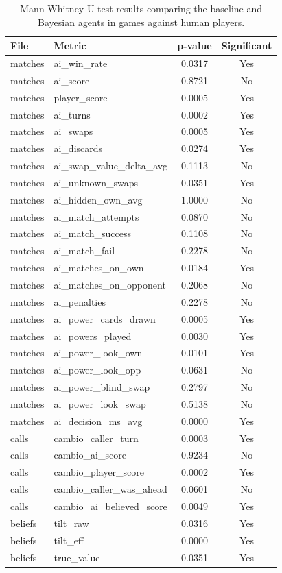 \documentclass[12pt,a4paper,oneside]{report}
\begin{document}
\begin{table}[H]
\centering
\small
\begin{tabular}{llcc}
\hline
\textbf{File} & \textbf{Metric} & \textbf{p-value} & \textbf{Significant} \\
\hline
matches & ai\_win\_rate & 0.0317 & Yes \\
matches & ai\_score & 0.8721 & No \\
matches & player\_score & 0.0005 & Yes \\
matches & ai\_turns & 0.0002 & Yes \\
matches & ai\_swaps & 0.0005 & Yes \\
matches & ai\_discards & 0.0274 & Yes \\
matches & ai\_swap\_value\_delta\_avg & 0.1113 & No \\
matches & ai\_unknown\_swaps & 0.0351 & Yes \\
matches & ai\_hidden\_own\_avg & 1.0000 & No \\
matches & ai\_match\_attempts & 0.0870 & No \\
matches & ai\_match\_success & 0.1108 & No \\
matches & ai\_match\_fail & 0.2278 & No \\
matches & ai\_matches\_on\_own & 0.0184 & Yes \\
matches & ai\_matches\_on\_opponent & 0.2068 & No \\
matches & ai\_penalties & 0.2278 & No \\
matches & ai\_power\_cards\_drawn & 0.0005 & Yes \\
matches & ai\_powers\_played & 0.0030 & Yes \\
matches & ai\_power\_look\_own & 0.0101 & Yes \\
matches & ai\_power\_look\_opp & 0.0631 & No \\
matches & ai\_power\_blind\_swap & 0.2797 & No \\
matches & ai\_power\_look\_swap & 0.5138 & No \\
matches & ai\_decision\_ms\_avg & 0.0000 & Yes \\
calls & cambio\_caller\_turn & 0.0003 & Yes \\
calls & cambio\_ai\_score & 0.9234 & No \\
calls & cambio\_player\_score & 0.0002 & Yes \\
calls & cambio\_caller\_was\_ahead & 0.0601 & No \\
calls & cambio\_ai\_believed\_score & 0.0049 & Yes \\
beliefs & tilt\_raw & 0.0316 & Yes \\
beliefs & tilt\_eff & 0.0000 & Yes \\
beliefs & true\_value & 0.0351 & Yes \\
\hline
\end{tabular}
\caption{Mann-Whitney U test results comparing the baseline and Bayesian agents in games against human players.}
\end{table}
\end{document}

